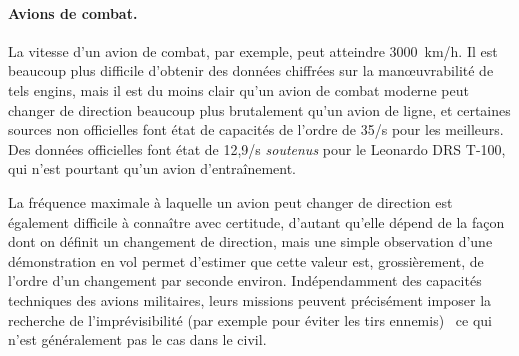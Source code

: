 	\paragraph{Avions de combat.}
	La vitesse d'un avion de combat, par exemple, peut atteindre 3000~km/h\footnotemark. Il est beaucoup plus difficile d'obtenir des données chiffrées sur la manœuvrabilité de tels engins, mais il est du moins clair qu'un avion de combat moderne peut changer de direction beaucoup plus brutalement qu'un avion de ligne, et certaines sources non officielles font état de capacités de l'ordre de 35\textdegree{}/s pour les meilleurs\footnotemark. Des données officielles font état de 12,9\textdegree{}/s \emph{soutenus} pour le Leonardo DRS T-100, qui n'est pourtant qu'un avion d'entraînement\footnotemark.
	
	\addtocounter{footnote}{-2}
	\addtocounter{footnote}{1}
	\addtocounter{footnote}{1}
	
	La fréquence maximale à laquelle un avion peut changer de direction est également difficile à connaître avec certitude, d'autant qu'elle dépend de la façon dont on définit un changement de direction, mais une simple observation d'une démonstration en vol permet d'estimer que cette valeur est, grossièrement, de l'ordre d'un changement par seconde environ\footnotemark. Indépendamment des capacités techniques des avions militaires, leurs missions peuvent précisément imposer la recherche de l'imprévisibilité (par exemple pour éviter les tirs ennemis)~\cite{shaw1985fighter} ce qui n'est généralement pas le cas dans le civil.
	
	
